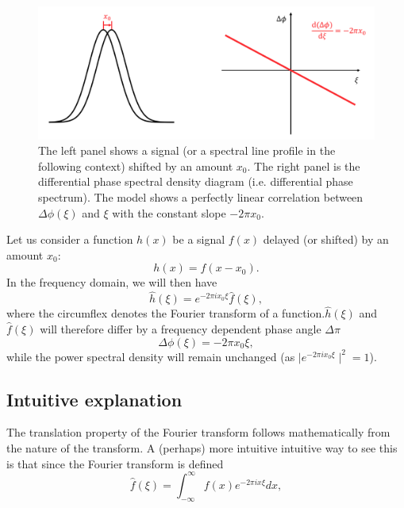 \begin{figure}[tbp]
\centering
\includegraphics[width = 0.99 \linewidth]
{./Figures/Methods/FT.png}
\caption[Translation property of Fourier transform]
{The left panel shows a signal (or a spectral line profile in the following context) shifted by an amount $x_0$. 
The right panel is the differential phase spectral density diagram (i.e. differential phase spectrum). 
The model shows a perfectly linear correlation 
between $\Delta \phi(\xi)$ and $\xi$ with the constant slope $-2 \pi x_0$.}
\label{fig:FT}
\end{figure} 

Let us consider a function $h(x)$ be a signal $f(x)$ delayed (or shifted) by an amount $x_0$:
\begin{equation}
	h(x) = f(x-x_0).
\label{eq:FT1}
\end{equation}
In the frequency domain, we will then have 
\begin{equation}
	\hat{h}(\xi) = e^{-2 \pi ix_0 \xi} \hat{f}(\xi),
\label{eq:FT2}
\end{equation}
where the circumflex denotes the Fourier transform of a function.$\hat{h}(\xi)$ and $\hat{f}(\xi)$ 
will therefore differ by a frequency dependent phase angle $\Delta\pi$
\begin{equation}
	\Delta \phi(\xi) = -2 \pi x_0 \xi,
\label{eq:PhaseShift}
\end{equation}
while the power spectral density will remain unchanged (as $\mid e^{-2 \pi ix_0 \xi}\mid ^2 = 1$).



\subsection{Intuitive explanation}

The translation property of the Fourier transform follows mathematically from the nature of the transform. 
A (perhaps) more intuitive intuitive way to see this is that since the Fourier transform is defined 
\begin{equation}
	\hat{f}(\xi) = \int_{-\infty}^{\infty} f(x) e^{-2 \pi ix \xi} dx, 
\label{eq:FT3}
\end{equation}

